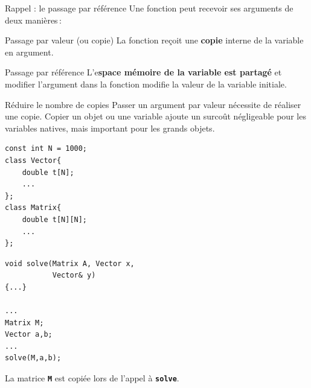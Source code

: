 \begin{frame}{Rappel : le passage par référence}
    Une fonction peut recevoir ses arguments de deux manières\,:
    \begin{block}{Passage par valeur (ou copie)}
        La fonction reçoit une \textbf{copie} interne de la variable en argument.
    \end{block}
    \begin{block}{Passage par référence}
        L'e\textbf{space mémoire de la variable est partagé} et modifier l'argument dans la fonction modifie la valeur de la variable initiale.
    \end{block}
\end{frame}

\begin{frame}[fragile=singleslide]{Réduire le nombre de copies}
    Passer un argument par valeur nécessite de réaliser une copie. Copier un objet ou une variable ajoute un surcoût négligeable pour les variables natives, mais important pour les grands objets.

    \begin{minipage}{0.46\linewidth}
            \begin{verbatim}
const int N = 1000;
class Vector{
    double t[N];
    ...
};
class Matrix{
    double t[N][N];
    ...
};
            \end{verbatim}
    \end{minipage}
    \hfill
    \begin{minipage}{0.48\linewidth}
            \begin{verbatim}
void solve(Matrix A, Vector x,
           Vector& y)
{...}

...
Matrix M;
Vector a,b;
...
solve(M,a,b);
            \end{verbatim}
    \end{minipage}

\vspace{0.2cm}
La matrice \texttt{\textbf{M}} est copiée lors de l'appel à \texttt{\textbf{solve}}.

\end{frame}

